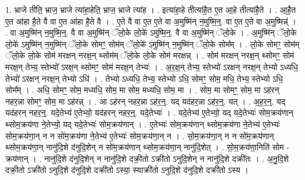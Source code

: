 \documentclass[17pt]{extarticle}
\begin{document}
1. भ्राजे तीति॒ भ्राज॒ भ्राजे त्या॑हा॒हेति॒ भ्राज॒ भ्राजे त्या॑ह । . इत्या॑हा॒हे तीत्या॑है॒त ए॒त आ॒हे तीत्या॑है॒ते । . आ॒है॒त ए॒त आ॑हा है॒ते वै वा ए॒त आ॑हा है॒ते वै । . ए॒ते वै वा ए॒त ए॒ते वा अ॒मुष्मि॑न् न॒मुष्मि॒न्॒. वा ए॒त ए॒ते वा अ॒मुष्मिन्न्॑ । . वा अ॒मुष्मि॑न् न॒मुष्मि॒न्॒. वै वा अ॒मुष्मि॑न् ॅलो॒के लो॒के॑ ऽमुष्मि॒न्॒. वै वा अ॒मुष्मि॑न् ॅलो॒के । . अ॒मुष्मि॑न् ॅलो॒के लो॒के॑ ऽमुष्मि॑न् न॒मुष्मि॑न् ॅलो॒के सोमꣳ॒॒ सोम॑म् ॅलो॒के॑ ऽमुष्मि॑न् न॒मुष्मि॑न् ॅलो॒के सोम᳚म् । . लो॒के सोमꣳ॒॒ सोम॑म् ॅलो॒के लो॒के सोम॑ मरक्षन् नरक्ष॒न् थ्सोम॑म् ॅलो॒के लो॒के सोम॑ मरक्षन्न् । . सोम॑ मरक्षन् नरक्ष॒न् थ्सोमꣳ॒॒ सोम॑ मरक्ष॒न् तेभ्य॒ स्तेभ्यो॑ ऽरक्ष॒न् थ्सोमꣳ॒॒ सोम॑ मरक्ष॒न् तेभ्यः॑ । . अ॒र॒क्ष॒न् तेभ्य॒ स्तेभ्यो॑ ऽरक्षन् नरक्ष॒न् तेभ्यो ऽध्यधि॒ तेभ्यो॑ ऽरक्षन् नरक्ष॒न् तेभ्यो ऽधि॑ । . तेभ्यो ऽध्यधि॒ तेभ्य॒ स्तेभ्यो ऽधि॒ सोमꣳ॒॒ सोम॒ मधि॒ तेभ्य॒ स्तेभ्यो ऽधि॒ सोम᳚म् । . अधि॒ सोमꣳ॒॒ सोम॒ मध्यधि॒ सोम॒ मा सोम॒ मध्यधि॒ सोम॒ मा । . सोम॒ मा सोमꣳ॒॒ सोम॒ मा ऽह॑रन् नहर॒न्ना सोमꣳ॒॒ सोम॒ मा ऽह॑रन्न् । . आ ऽह॑रन् नहर॒न्ना ऽह॑र॒न्॒. यद् यद॑हर॒न्ना ऽह॑र॒न्॒. यत् । . अ॒ह॒र॒न्॒. यद् यद॑हरन् नहर॒न्॒. यदे॒तेभ्य॑ ए॒तेभ्यो॒ यद॑हरन् नहर॒न्॒. यदे॒तेभ्यः॑ । . यदे॒तेभ्य॑ ए॒तेभ्यो॒ यद् यदे॒तेभ्यः॑ सोम॒क्रय॑णान् थ्सोम॒क्रय॑णा ने॒तेभ्यो॒ यद् यदे॒तेभ्यः॑ सोम॒क्रय॑णान् । . ए॒तेभ्यः॑ सोम॒क्रय॑णान् थ्सोम॒क्रय॑णा ने॒तेभ्य॑ ए॒तेभ्यः॑ सोम॒क्रय॑णा॒न् न न सो॑म॒क्रय॑णा ने॒तेभ्य॑ ए॒तेभ्यः॑ सोम॒क्रय॑णा॒न् न । . सो॒म॒क्रय॑णा॒न् न न सो॑म॒क्रय॑णान् थ्सोम॒क्रय॑णा॒न् नानु॑दि॒शे द॑नुदि॒शेन् न सो॑म॒क्रय॑णान् थ्सोम॒क्रय॑णा॒न् नानु॑दि॒शेत् । . सो॒म॒क्रय॑णा॒निति॑ सोम - क्रय॑णान् । . नानु॑दि॒शे द॑नुदि॒शेन् न नानु॑दि॒शे दक्री॒तो ऽक्री॑तो ऽनुदि॒शेन् न नानु॑दि॒शे दक्री॑तः । . अ॒नु॒दि॒शे दक्री॒तो ऽक्री॑तो ऽनुदि॒शे द॑नुदि॒शे दक्री॑तो ऽस्या॒ स्याक्री॑तो ऽनुदि॒शे द॑नुदि॒शे दक्री॑तो ऽस्य । \newline
\end{document}
